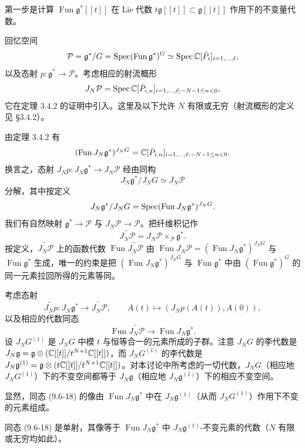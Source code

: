第一步是计算 $\operatorname{Fun}\mathfrak{g}^*[[t]]$ 在 Lie 代数 $t\mathfrak{g}[[t]]\subset\mathfrak{g}[[t]]$ 作用下的不变量代数。

回忆空间
\[
    \mathcal{P}=\mathfrak{g}^*/G=\operatorname{Spec}(\operatorname{Fun}\mathfrak{g}^*)^G\simeq\operatorname{Spec}\mathbb{C}[\bar P_i]_{i=1,\dots,\ell},
\]
以及态射 $p:\mathfrak{g}^*\to\mathcal{P}$。考虑相应的射流概形
\[
    J_N\mathcal{P}=\operatorname{Spec}\mathbb{C}[\bar P_{i,n}]_{i=1,\dots,\ell;-N-1\le n<0},
\]
它在定理 3.4.2 的证明中引入。这里及以下允许 $N$ 有限或无穷（射流概形的定义见 §3.4.2）。

由定理 3.4.2 有
\[
    (\operatorname{Fun}J_N\mathfrak{g}^*)^{J_NG}=\mathbb{C}[\bar P_{i,n}]_{i=1,\dots,\ell;-N-1\le n<0}.
\]
换言之，态射 $J_Np:J_N\mathfrak{g}^*\to J_N\mathcal{P}$ 经由同构
\[
    J_N\mathfrak{g}^*/J_NG\simeq J_N\mathcal{P}
\]
分解，其中按定义
\[
    J_N\mathfrak{g}^*/J_NG=\operatorname{Spec}(\operatorname{Fun}J_N\mathfrak{g}^*)^{J_NG}.
\]
我们有自然映射 $\mathfrak{g}^*\to\mathcal{P}$ 与 $J_N\mathcal{P}\to\mathcal{P}$。把纤维积记作
\[
    \widetilde{J_N\mathcal{P}}=J_N\mathcal{P}\times_{\mathcal{P}}\mathfrak{g}^*.
\]
按定义，$\widetilde{J_N\mathcal{P}}$ 上的函数代数 $\operatorname{Fun}\widetilde{J_N\mathcal{P}}$ 由 $\operatorname{Fun}J_N\mathcal{P}=(\operatorname{Fun}J_N\mathfrak{g}^*)^{J_NG}$ 与 $\operatorname{Fun}\mathfrak{g}^*$ 生成，唯一的约束是把 $(\operatorname{Fun}J_N\mathfrak{g}^*)^{J_NG}$ 与 $\operatorname{Fun}\mathfrak{g}^*$ 中由 $(\operatorname{Fun}\mathfrak{g}^*)^G$ 的同一元素拉回所得的元素等同。

考虑态射
\[
    \widetilde{J_Np}:J_N\mathfrak{g}^*\to\widetilde{J_N\mathcal{P}},
    \qquad
    A(t)\mapsto(J_Np(A(t)),A(0)),
\]
以及相应的代数同态
\begin{equation}
    \operatorname{Fun}\widetilde{J_N\mathcal{P}}\to\operatorname{Fun}J_N\mathfrak{g}^* .
    \tag{9.6-18}
\end{equation}
设 $J_NG^{(1)}$ 是 $J_NG$ 中模 $t$ 与恒等合一的元素所成的子群。注意 $J_NG$ 的李代数是 $J_N\mathfrak{g}=\mathfrak{g}\otimes(\mathbb{C}[[t]]/t^{N+1}\mathbb{C}[[t]])$，而 $J_NG^{(1)}$ 的李代数是 $J_N\mathfrak{g}^{(1)}=\mathfrak{g}\otimes(t\mathbb{C}[[t]]/t^{N+1}\mathbb{C}[[t]])$。对本讨论中所考虑的一切代数，$J_NG$（相应地 $J_NG^{(1)}$）下的不变空间都等于 $J_N\mathfrak{g}$（相应地 $J_N\mathfrak{g}^{(1)}$）下的相应不变空间。

显然，同态 (9.6-18) 的像由 $\operatorname{Fun}J_N\mathfrak{g}^*$ 中在 $J_N\mathfrak{g}^{(1)}$（从而 $J_NG^{(1)}$）作用下不变的元素组成。

\begin{proposition}
    同态 (9.6-18) 是单射，其像等于 $\operatorname{Fun}J_N\mathfrak{g}^*$ 中 $J_N\mathfrak{g}^{(1)}$-不变元素的代数（$N$ 有限或无穷均如此）。
\end{proposition}

